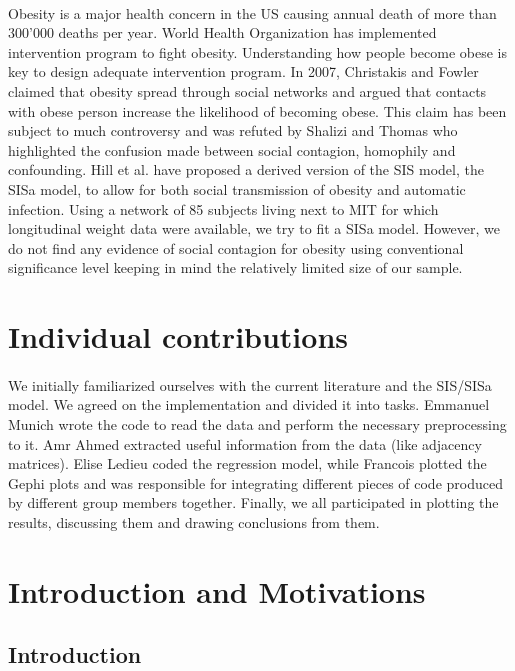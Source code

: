 \documentclass[11pt]{article}
\begin{document}
\paragraph{}
Obesity is a major health concern in the US causing annual death of more than 300'000 deaths per year. World Health Organization has implemented intervention program to fight obesity.  Understanding how people become obese is key to design adequate intervention program. In 2007, Christakis and Fowler claimed that obesity spread through social networks and argued that contacts with obese person increase the likelihood of becoming obese. This claim has been subject to much controversy and was refuted by Shalizi and Thomas who highlighted the confusion made between social contagion, homophily and confounding.  Hill et al. have proposed a derived version of the SIS model, the SISa model, to allow for both social transmission of obesity and automatic infection. Using a network of 85 subjects living next to MIT for which longitudinal weight data were available, we try to fit a SISa model. However, we do not find any evidence of social contagion for obesity using conventional significance level keeping in mind the relatively limited size of our sample.

\section{Individual contributions}
\paragraph{}
We initially familiarized ourselves with the current literature and the SIS/SISa model. We agreed on the implementation and divided it into tasks. Emmanuel Munich wrote the code to read the data and perform the necessary preprocessing to it. Amr Ahmed extracted useful information from the data (like adjacency matrices). Elise Ledieu coded the regression model, while Francois plotted the Gephi plots and was responsible for integrating different pieces of code produced by different group members together. Finally, we all participated in plotting the results, discussing them and drawing conclusions from them.

\section{Introduction and Motivations}

\subsection{Introduction}
\end{document}

